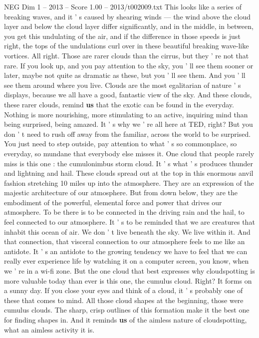 \begin{textsample}{NEG Dim 1 – 2013 – Score 1.00 – 2013/t002009.txt}
This looks like a series of breaking waves, and it ' s caused by shearing winds — the wind above the cloud layer and below the cloud layer differ significantly, and in the middle, in between, you get this undulating of the air, and if the difference in those speeds is just right, the tops of the undulations curl over in these beautiful breaking wave-like vortices.
All right.
Those are rarer clouds than the cirrus, but they ' re not that rare.
If you look up, and you pay attention to the sky, you ' ll see them sooner or later, maybe not quite as dramatic as these, but you ' ll see them.
And you ' ll see them around where you live.
Clouds are the most egalitarian of nature ' s displays, because we all have a good, fantastic view of the sky.
And these clouds, these rarer clouds, remind \textbf{us} that the exotic can be found in the everyday.
Nothing is more nourishing, more stimulating to an active, inquiring mind than being surprised, being amazed.
It ' s why we ' re all here at TED, right?
But you don ' t need to rush off away from the familiar, across the world to be surprised.
You just need to step outside, pay attention to what ' s so commonplace, so everyday, so mundane that everybody else misses it.
One cloud that people rarely miss is this one : the cumulonimbus storm cloud.
It ' s what ' s produces thunder and lightning and hail.
These clouds spread out at the top in this enormous anvil fashion stretching 10 miles up into the atmosphere.
They are an expression of the majestic architecture of our atmosphere.
But from down below, they are the embodiment of the powerful, elemental force and power that drives our atmosphere.
To be there is to be connected in the driving rain and the hail, to feel connected to our atmosphere.
It ' s to be reminded that we are creatures that inhabit this ocean of air.
We don ' t live beneath the sky.
We live within it.
And that connection, that visceral connection to our atmosphere feels to me like an antidote.
It ' s an antidote to the growing tendency we have to feel that we can really ever experience life by watching it on a computer screen, you know, when we ' re in a wi-fi zone.
But the one cloud that best expresses why cloudspotting is more valuable today than ever is this one, the cumulus cloud.
Right?
It forms on a sunny day.
If you close your eyes and think of a cloud, it ' s probably one of these that comes to mind.
All those cloud shapes at the beginning, those were cumulus clouds.
The sharp, crisp outlines of this formation make it the best one for finding shapes in.
And it reminds \textbf{us} of the aimless nature of cloudspotting, what an aimless activity it is.

\end{textsample}
